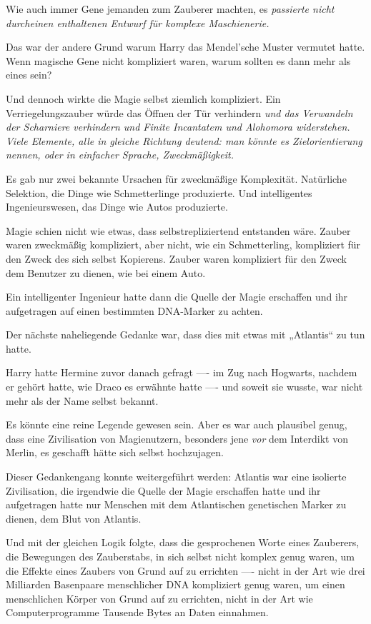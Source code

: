 {Wie auch immer Gene jemanden zum Zauberer machten, es \emph{passierte nicht durcheinen enthaltenen Entwurf für komplexe Maschienerie.}

Das war der andere Grund warum Harry das Mendel'sche Muster vermutet hatte. Wenn magische Gene nicht kompliziert waren, warum sollten es dann mehr als eines sein?

Und dennoch wirkte die Magie selbst ziemlich kompliziert. Ein Verriegelungszauber würde das Öffnen der Tür verhindern \emph{und das Verwandeln der Scharniere verhindern \emph{und} \emph{Finite Incantatem} und \emph{Alohomora} widerstehen. Viele Elemente, alle in gleiche Richtung deutend: man könnte es Zielorientierung nennen, oder in einfacher Sprache, Zweckmäßigkeit.}

Es gab nur zwei bekannte Ursachen für zweckmäßige Komplexität. Natürliche Selektion, die Dinge wie Schmetterlinge produzierte. Und intelligentes Ingenieurswesen, das Dinge wie Autos produzierte.

Magie schien nicht wie etwas, dass selbstrepliziertend entstanden wäre. Zauber waren zweckmäßig kompliziert, aber nicht, wie ein Schmetterling, kompliziert für den Zweck des sich selbst Kopierens. Zauber waren kompliziert für den Zweck dem Benutzer zu dienen, wie bei einem Auto.

Ein intelligenter Ingenieur hatte dann die Quelle der Magie erschaffen und ihr aufgetragen auf einen bestimmten DNA-Marker zu achten.

Der nächste naheliegende Gedanke war, dass dies mit etwas mit „Atlantis“ zu tun hatte.

Harry hatte Hermine zuvor danach gefragt ---- im Zug nach Hogwarts, nachdem er gehört hatte, wie Draco es erwähnte hatte ---- und soweit sie wusste, war nicht mehr als der Name selbst bekannt.

Es könnte eine reine Legende gewesen sein. Aber es war auch plausibel genug, dass eine Zivilisation von Magienutzern, besonders jene \emph{vor} dem Interdikt von Merlin, es geschafft hätte sich selbst hochzujagen.

Dieser Gedankengang konnte weitergeführt werden: Atlantis war eine isolierte Zivilisation, die irgendwie die Quelle der Magie erschaffen hatte und ihr aufgetragen hatte nur Menschen mit dem Atlantischen genetischen Marker zu dienen, dem Blut von Atlantis.

Und mit der gleichen Logik folgte, dass die gesprochenen Worte eines Zauberers, die Bewegungen des Zauberstabs, in sich selbst nicht komplex genug waren, um die Effekte eines Zaubers von Grund auf zu errichten ---- nicht in der Art wie drei Milliarden Basenpaare menschlicher DNA kompliziert genug waren, um einen menschlichen Körper von Grund auf zu errichten, nicht in der Art wie Computerprogramme Tausende Bytes an Daten einnahmen.

}
